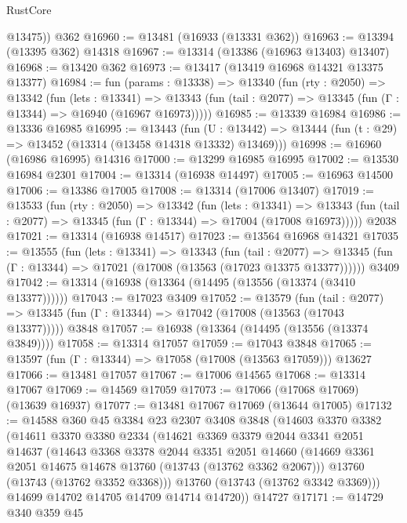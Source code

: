 \begin{lexlean}{RustCore}
\begin{coremodule}
        @13475))
    @362
@16960 := @13481 (@16933 (@13331 @362))
@16963 := @13394 (@13395 @362) @14318
@16967 := @13314 (@13386 (@16963 @13403) @13407)
@16968 := @13420 @362
@16973 := @13417 (@13419 @16968 @14321 @13375 @13377)
@16984 := fun (params : @13338) =>
  @13340
    (fun (rty : @2050) =>
    @13342
      (fun (lets : @13341) =>
      @13343 (fun (tail : @2077) => @13345 (fun (Γ : @13344) => @16940 (@16967 @16973)))))
@16985 := @13339 @16984
@16986 := @13336 @16985
@16995 := @13443
    (fun (U : @13442) => @13444 (fun (t : @29) => @13452 (@13314 (@13458 @14318 @13332) @13469)))
@16998 := @16960 (@16986 @16995) @14316
@17000 := @13299 @16985 @16995
@17002 := @13530 @16984 @2301
@17004 := @13314 (@16938 @14497)
@17005 := @16963 @14500
@17006 := @13386 @17005
@17008 := @13314 (@17006 @13407)
@17019 := @13533
    (fun (rty : @2050) =>
    @13342
      (fun (lets : @13341) =>
      @13343 (fun (tail : @2077) => @13345 (fun (Γ : @13344) => @17004 (@17008 @16973)))))
    @2038
@17021 := @13314 (@16938 @14517)
@17023 := @13564 @16968 @14321
@17035 := @13555
    (fun (lets : @13341) =>
    @13343
      (fun (tail : @2077) =>
      @13345 (fun (Γ : @13344) => @17021 (@17008 (@13563 (@17023 @13375 @13377))))))
    @3409
@17042 := @13314 (@16938 (@13364 (@14495 (@13556 (@13374 (@3410 @13377))))))
@17043 := @17023 @3409
@17052 := @13579
    (fun (tail : @2077) => @13345 (fun (Γ : @13344) => @17042 (@17008 (@13563 (@17043 @13377)))))
    @3848
@17057 := @16938 (@13364 (@14495 (@13556 (@13374 @3849))))
@17058 := @13314 @17057
@17059 := @17043 @3848
@17065 := @13597 (fun (Γ : @13344) => @17058 (@17008 (@13563 @17059))) @13627
@17066 := @13481 @17057
@17067 := @17006 @14565
@17068 := @13314 @17067
@17069 := @14569 @17059
@17073 := @17066 (@17068 @17069) (@13639 @16937)
@17077 := @13481 @17067 @17069 (@13644 @17005)
@17132 := @14588
    @360
    @45
    @3384
    @23
    @2307
    @3408
    @3848
    (@14603
      @3370
      @3382
      (@14611
        @3370
        @3380
        @2334
        (@14621
          @3369
          @3379
          @2044
          @3341
          @2051
          @14637
          (@14643
            @3368
            @3378
            @2044
            @3351
            @2051
            @14660
            (@14669 @3361 @2051 @14675 @14678 @13760 (@13743 (@13762 @3362 @2067)))
            @13760
            (@13743 (@13762 @3352 @3368)))
          @13760
          (@13743 (@13762 @3342 @3369)))
        @14699
        @14702
        @14705
        @14709
        @14714
        @14720))
    @14727
@17171 := @14729
    @340
    @359
    @45

\end{coremodule}
\end{lexlean}

